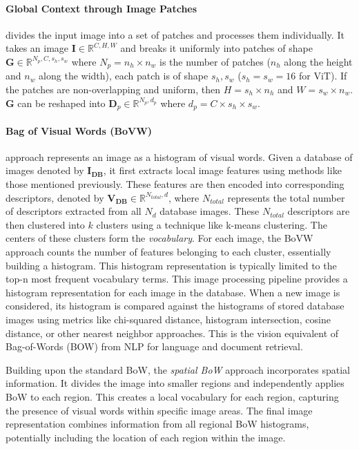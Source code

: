 \paragraph{Global Context through Image Patches} divides the input
image into a set of patches and processes them individually. It takes
an image $\mathbf{I} \in \mathbb{R}^{C, H, W}$ and breaks it uniformly
into patches of shape $\mathbf{G} \in \mathbb{R}^{N_p, C, s_h, s_w}$
where $N_p = n_h \times n_w$ is the number of patches ($n_h$ along the
height and $n_w$ along the width), each patch is of shape $s_h, s_w$
($s_h = s_w = 16$ for ViT). If the patches are non-overlapping and
uniform, then $H = s_h \times n_h$ and $W = s_w \times n_w$.
$\mathbf{G}$ can be reshaped into $\mathbf{D}_p \in \mathbb{R}^{N_p,
d_p}$ where $d_p = C \times s_h \times s_w$.

\paragraph{Bag of Visual Words (BoVW)} \cite{Sivic2003VideoGA}
approach represents an image as a histogram of visual words. Given a
database of images denoted by $\mathbf{I}_{\textbf{DB}}$, it first
extracts local image features using methods like those mentioned
previously. These features are then encoded into corresponding
descriptors, denoted by $\mathbf{V}_{\textbf{DB}} \in
\mathbb{R}^{N_{total}, d}$, where $N_{total}$ represents the total
number of descriptors extracted from all $N_d$ database images. These
$N_{total}$ descriptors are then clustered into $k$ clusters using a
technique like k-means clustering. The centers of these clusters form
the \emph{vocabulary}. For each image, the BoVW approach counts the
number of features belonging to each cluster, essentially building a
histogram. This histogram representation is typically limited to the
top-n most frequent vocabulary terms. This image processing pipeline
provides a histogram representation for each image in the database.
When a new image is considered, its histogram is compared against the
histograms of stored database images using metrics like chi-squared
distance, histogram intersection, cosine distance, or other nearest
neighbor approaches. This is the vision equivalent of Bag-of-Words
(BOW) from NLP for language and document retrieval.

Building upon the standard BoW, the \emph{spatial BoW} approach
incorporates spatial information. It divides the image into smaller
regions and independently applies BoW to each region. This creates a
local vocabulary for each region, capturing the presence of visual
words within specific image areas. The final image representation
combines information from all regional BoW histograms, potentially
including the location of each region within the image.

